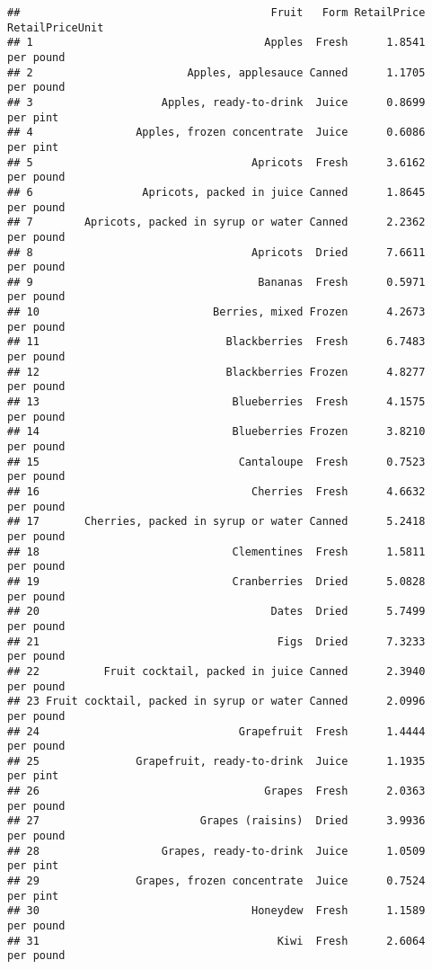 \documentclass[
]{article}
\begin{document}
\begin{verbatim}
##                                       Fruit   Form RetailPrice RetailPriceUnit
## 1                                    Apples  Fresh      1.8541       per pound
## 2                        Apples, applesauce Canned      1.1705       per pound
## 3                    Apples, ready-to-drink  Juice      0.8699        per pint
## 4                Apples, frozen concentrate  Juice      0.6086        per pint
## 5                                  Apricots  Fresh      3.6162       per pound
## 6                 Apricots, packed in juice Canned      1.8645       per pound
## 7        Apricots, packed in syrup or water Canned      2.2362       per pound
## 8                                  Apricots  Dried      7.6611       per pound
## 9                                   Bananas  Fresh      0.5971       per pound
## 10                           Berries, mixed Frozen      4.2673       per pound
## 11                             Blackberries  Fresh      6.7483       per pound
## 12                             Blackberries Frozen      4.8277       per pound
## 13                              Blueberries  Fresh      4.1575       per pound
## 14                              Blueberries Frozen      3.8210       per pound
## 15                               Cantaloupe  Fresh      0.7523       per pound
## 16                                 Cherries  Fresh      4.6632       per pound
## 17       Cherries, packed in syrup or water Canned      5.2418       per pound
## 18                              Clementines  Fresh      1.5811       per pound
## 19                              Cranberries  Dried      5.0828       per pound
## 20                                    Dates  Dried      5.7499       per pound
## 21                                     Figs  Dried      7.3233       per pound
## 22          Fruit cocktail, packed in juice Canned      2.3940       per pound
## 23 Fruit cocktail, packed in syrup or water Canned      2.0996       per pound
## 24                               Grapefruit  Fresh      1.4444       per pound
## 25               Grapefruit, ready-to-drink  Juice      1.1935        per pint
## 26                                   Grapes  Fresh      2.0363       per pound
## 27                         Grapes (raisins)  Dried      3.9936       per pound
## 28                   Grapes, ready-to-drink  Juice      1.0509        per pint
## 29               Grapes, frozen concentrate  Juice      0.7524        per pint
## 30                                 Honeydew  Fresh      1.1589       per pound
## 31                                     Kiwi  Fresh      2.6064       per pound

\end{verbatim}
\end{document}
